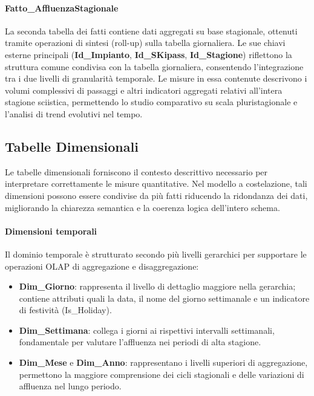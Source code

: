 \paragraph{Fatto\_AffluenzaStagionale}
La seconda tabella dei fatti contiene dati aggregati su base stagionale, ottenuti tramite operazioni di sintesi (roll-up) sulla tabella giornaliera.
Le sue chiavi esterne principali (\textbf{Id\_Impianto}, \textbf{Id\_SKipass}, \textbf{Id\_Stagione}) riflettono la struttura comune condivisa con la tabella giornaliera, consentendo l'integrazione tra i due livelli di granularità temporale.
Le misure in essa contenute descrivono i volumi complessivi di passaggi e altri indicatori aggregati relativi all'intera stagione sciistica, permettendo lo studio comparativo su scala pluristagionale e l'analisi di trend evolutivi nel tempo.

\subsection{Tabelle Dimensionali}

Le tabelle dimensionali forniscono il contesto descrittivo necessario per interpretare correttamente le misure quantitative.
Nel modello a costelazione, tali dimensioni possono essere condivise da più fatti riducendo la ridondanza dei dati, migliorando la chiarezza semantica e la coerenza logica dell'intero schema. 

\paragraph{Dimensioni temporali}
Il dominio temporale è strutturato secondo più livelli gerarchici per supportare le operazioni OLAP di aggregazione e disaggregazione:

\begin{itemize}
    \item \textbf{Dim\_Giorno}: rappresenta il livello di dettaglio maggiore nella gerarchia; contiene attributi quali la data, il nome del giorno settimanale e un indicatore di festività (Is\_Holiday).
    \item \textbf{Dim\_Settimana}: collega i giorni ai rispettivi intervalli settimanali, fondamentale per valutare l'affluenza nei periodi di alta stagione.
    \item \textbf{Dim\_Mese} e \textbf{Dim\_Anno}: rappresentano i livelli superiori di aggregazione, permettono la maggiore comprensione dei cicli stagionali e delle variazioni di affluenza nel lungo periodo.
\end{itemize}

